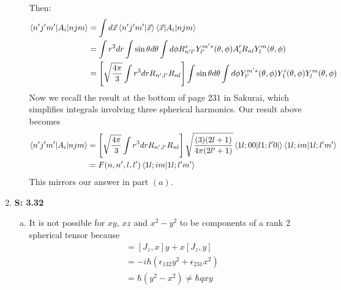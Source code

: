 \documentclass[12pt, letterpaper]{article}
\begin{document}
\begin{enumerate}
\begin{enumerate}[(a)]
Then:
\begin{align}
    \braket{n'j'm'|A_i|njm}&=\int d\vec{x} \braket{n'j'm'|\vec{x}}\braket{\vec{x}|A_i|njm}\\&=\int r^2 dr \int \sin{\theta} d\theta \int d\phi R^*_{n'l'}Y_{l'}^{m'*}(\theta,\phi)A_i' R_{nl}Y_l^m(\theta,\phi)\\&=\left[\sqrt{\frac{4\pi}{3}}\int r^3 dr R_{n',l'}R_{nl}\right]\int \sin{\theta} d\theta \int d\phi Y_{l'}^{m'*}(\theta,\phi)Y_1^i(\theta,\phi)Y_l^m(\theta,\phi)
\end{align}
Now we recall the result at the bottom of page $231$ in Sakurai, which simplifies integrals involving three spherical harmonics. Our result above becomes
\begin{align}
        \braket{n'j'm'|A_i|njm}&=\left[\sqrt{\frac{4\pi}{3}}\int r^3 dr R_{n',l'}R_{nl}\right]\sqrt{\frac{(3)(2l+1)}{4\pi (2l'+1)}}\braket{1l;00|l1;l'0|}\braket{1l;im|1l;l'm'}\\&=F(n,n',l,l
        ')\braket{1l;im|1l;l'm'}
\end{align}
This mirrors our answer in part $(a)$.
\end{enumerate}

    \item[] \textbf{S: 3.32} 
    \begin{enumerate}[(a)]
\item It is not possible for $xy$, $xz$ and $x^2-y^2$ to be components of a rank 2 spherical tensor because
\begin{align}
        [J_z,xy]&=[J_z,x]y+x[J_z,y]\\&=-i\hbar \left(\epsilon_{132}y^2+\epsilon_{231}x^2\right)\\&=\hbar\left(y^2-x^2\right)\neq \hbar q xy
\end{align}


\end{enumerate}
\end{enumerate}
\end{document}
